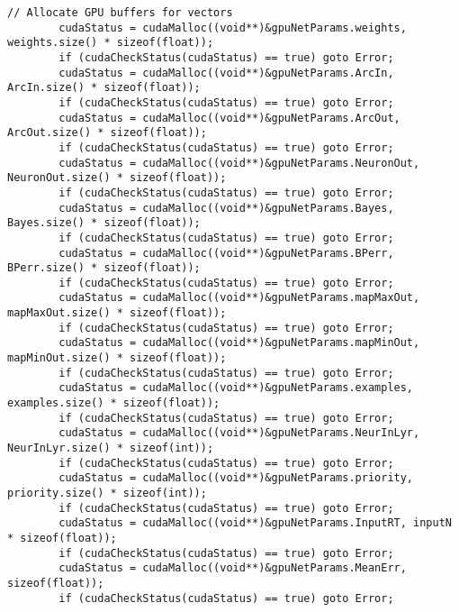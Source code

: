 \documentclass[10pt,a4paper]{article}
\begin{document}
\begin{lstlisting}[style=mycuda, caption=librerie usate, captionpos=b]
		// Allocate GPU buffers for vectors    
		cudaStatus = cudaMalloc((void**)&gpuNetParams.weights, weights.size() * sizeof(float));
		if (cudaCheckStatus(cudaStatus) == true) goto Error;
		cudaStatus = cudaMalloc((void**)&gpuNetParams.ArcIn, ArcIn.size() * sizeof(float));
		if (cudaCheckStatus(cudaStatus) == true) goto Error;
		cudaStatus = cudaMalloc((void**)&gpuNetParams.ArcOut, ArcOut.size() * sizeof(float));
		if (cudaCheckStatus(cudaStatus) == true) goto Error;
		cudaStatus = cudaMalloc((void**)&gpuNetParams.NeuronOut, NeuronOut.size() * sizeof(float));
		if (cudaCheckStatus(cudaStatus) == true) goto Error;
		cudaStatus = cudaMalloc((void**)&gpuNetParams.Bayes, Bayes.size() * sizeof(float));
		if (cudaCheckStatus(cudaStatus) == true) goto Error;
		cudaStatus = cudaMalloc((void**)&gpuNetParams.BPerr, BPerr.size() * sizeof(float));
		if (cudaCheckStatus(cudaStatus) == true) goto Error;
		cudaStatus = cudaMalloc((void**)&gpuNetParams.mapMaxOut, mapMaxOut.size() * sizeof(float));
		if (cudaCheckStatus(cudaStatus) == true) goto Error;
		cudaStatus = cudaMalloc((void**)&gpuNetParams.mapMinOut, mapMinOut.size() * sizeof(float));
		if (cudaCheckStatus(cudaStatus) == true) goto Error;
		cudaStatus = cudaMalloc((void**)&gpuNetParams.examples, examples.size() * sizeof(float));
		if (cudaCheckStatus(cudaStatus) == true) goto Error;
		cudaStatus = cudaMalloc((void**)&gpuNetParams.NeurInLyr, NeurInLyr.size() * sizeof(int));
		if (cudaCheckStatus(cudaStatus) == true) goto Error;
		cudaStatus = cudaMalloc((void**)&gpuNetParams.priority, priority.size() * sizeof(int));
		if (cudaCheckStatus(cudaStatus) == true) goto Error;
		cudaStatus = cudaMalloc((void**)&gpuNetParams.InputRT, inputN * sizeof(float));
		if (cudaCheckStatus(cudaStatus) == true) goto Error;
		cudaStatus = cudaMalloc((void**)&gpuNetParams.MeanErr, sizeof(float));
		if (cudaCheckStatus(cudaStatus) == true) goto Error;



\end{lstlisting}
\end{document}
